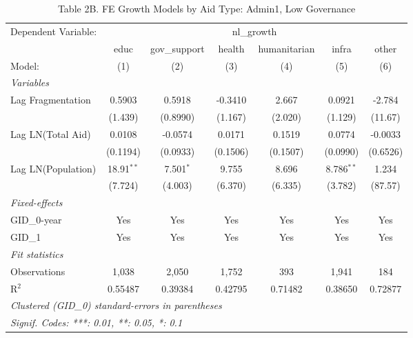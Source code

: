\begin{table}[htbp]
   \caption{Table 2B. FE Growth Models by Aid Type: Admin1, Low Governance}
   \centering
   \begin{tabular}{lcccccc}
      \tabularnewline \midrule \midrule
      Dependent Variable: & \multicolumn{6}{c}{nl\_growth}\\
                         & educ         & gov\_support  & health   & humanitarian & infra        & other \\   
      Model:             & (1)          & (2)           & (3)      & (4)          & (5)          & (6)\\  
      \midrule
      \emph{Variables}\\
      Lag Fragmentation  & 0.5903       & 0.5918        & -0.3410  & 2.667        & 0.0921       & -2.784\\   
                         & (1.439)      & (0.8990)      & (1.167)  & (2.020)      & (1.129)      & (11.67)\\   
      Lag LN(Total Aid)  & 0.0108       & -0.0574       & 0.0171   & 0.1519       & 0.0774       & -0.0033\\   
                         & (0.1194)     & (0.0933)      & (0.1506) & (0.1507)     & (0.0990)     & (0.6526)\\   
      Lag LN(Population) & 18.91$^{**}$ & 7.501$^{*}$   & 9.755    & 8.696        & 8.786$^{**}$ & 1.234\\   
                         & (7.724)      & (4.003)       & (6.370)  & (6.335)      & (3.782)      & (87.57)\\   
      \midrule
      \emph{Fixed-effects}\\
      GID\_0-year        & Yes          & Yes           & Yes      & Yes          & Yes          & Yes\\  
      GID\_1             & Yes          & Yes           & Yes      & Yes          & Yes          & Yes\\  
      \midrule
      \emph{Fit statistics}\\
      Observations       & 1,038        & 2,050         & 1,752    & 393          & 1,941        & 184\\  
      R$^2$              & 0.55487      & 0.39384       & 0.42795  & 0.71482      & 0.38650      & 0.72877\\  
      \midrule \midrule
      \multicolumn{7}{l}{\emph{Clustered (GID\_0) standard-errors in parentheses}}\\
      \multicolumn{7}{l}{\emph{Signif. Codes: ***: 0.01, **: 0.05, *: 0.1}}\\
   \end{tabular}
\end{table}



